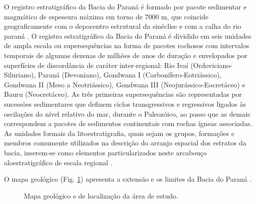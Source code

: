 O registro estratigráfico da Bacia do Paraná é formado por pacote sedimentar e magmático de espessura máxima em torno de $7000$ m, que coincide geograficamente com o depocentro estrutural da sinéclise e com a calha do rio paraná \citep{milani_orogenias_1998}. O registro estratigráfico da Bacia do Paraná é dividido em seis unidades de ampla escala ou supersequências \citep{Vail_1977} na forma de pacotes rochosos com intervalos temporais de algumas dezenas de milhões de anos de duração e envelopados por superfícies de discordância de caráter inter-regional: Rio Ivaí (Ordoviciano-Siluriano), Paraná (Devoniano), Gondwana I (Carbonífero-Eotriássico), Gondwana II (Meso a Neotriássico), Gondwana III (Neojurássico-Eocretáceo) e Bauru (Neocretáceo). As três primeiras supersequências são representadas por sucessões sedimentares que definem ciclos transgressivos e regressivos ligados às oscilações do nível relativo do mar, durante o Paleozóico, ao passo que as demais correspondem a pacotes de sedimentos continentais com rochas ígneas associadas. As unidades formais da litoestratigrafia, quais sejam os grupos, formações e membros comumente utilizados na descrição do arranjo espacial dos estratos da bacia, inserem-se como elementos particularizados neste arcabouço aloestratigráfico de escala regional \citep{boletim_2007}.

O mapa geológico (Fig. \ref{mapa geologico}) apresenta a extensão e os limites da Bacia do Paraná \citep{Vidotti_2003}.



\begin{figure}[H]
	\centering
	\setlength{\fboxsep}{8pt}
	\setlength{\fboxrule}{0.1pt}
	\caption{Mapa geológico e de localização da área de estudo. }
	\label{mapa geologico}
\end{figure}

